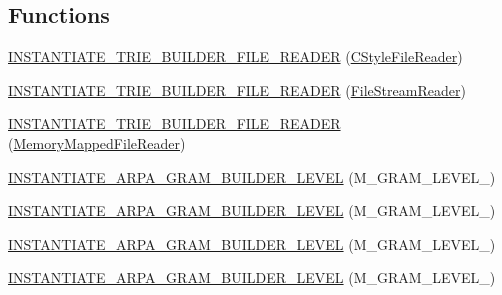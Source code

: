 \subsection*{Functions}
\begin{DoxyCompactItemize}
\item 
\hyperlink{namespaceuva_1_1smt_1_1bpbd_1_1server_1_1lm_1_1arpa_a3abd0485a67c1594eaf33dd0faeb4a70}{I\+N\+S\+T\+A\+N\+T\+I\+A\+T\+E\+\_\+\+T\+R\+I\+E\+\_\+\+B\+U\+I\+L\+D\+E\+R\+\_\+\+F\+I\+L\+E\+\_\+\+R\+E\+A\+D\+E\+R} (\hyperlink{classuva_1_1utils_1_1file_1_1_c_style_file_reader}{C\+Style\+File\+Reader})
\item 
\hyperlink{namespaceuva_1_1smt_1_1bpbd_1_1server_1_1lm_1_1arpa_a2dfedb4ab8ce840c46c677d09bcb2f13}{I\+N\+S\+T\+A\+N\+T\+I\+A\+T\+E\+\_\+\+T\+R\+I\+E\+\_\+\+B\+U\+I\+L\+D\+E\+R\+\_\+\+F\+I\+L\+E\+\_\+\+R\+E\+A\+D\+E\+R} (\hyperlink{classuva_1_1utils_1_1file_1_1_file_stream_reader}{File\+Stream\+Reader})
\item 
\hyperlink{namespaceuva_1_1smt_1_1bpbd_1_1server_1_1lm_1_1arpa_af3dfbdd835453813dcb20adedfbba9c8}{I\+N\+S\+T\+A\+N\+T\+I\+A\+T\+E\+\_\+\+T\+R\+I\+E\+\_\+\+B\+U\+I\+L\+D\+E\+R\+\_\+\+F\+I\+L\+E\+\_\+\+R\+E\+A\+D\+E\+R} (\hyperlink{classuva_1_1utils_1_1file_1_1_memory_mapped_file_reader}{Memory\+Mapped\+File\+Reader})
\item 
\hyperlink{namespaceuva_1_1smt_1_1bpbd_1_1server_1_1lm_1_1arpa_aeb9e5217f2df56aebcf96721d5ef9d1e}{I\+N\+S\+T\+A\+N\+T\+I\+A\+T\+E\+\_\+\+A\+R\+P\+A\+\_\+\+G\+R\+A\+M\+\_\+\+B\+U\+I\+L\+D\+E\+R\+\_\+\+L\+E\+V\+E\+L} (M\+\_\+\+G\+R\+A\+M\+\_\+\+L\+E\+V\+E\+L\+\_)
\item 
\hyperlink{namespaceuva_1_1smt_1_1bpbd_1_1server_1_1lm_1_1arpa_afa64b0870997b1747c927e17edb4d8d2}{I\+N\+S\+T\+A\+N\+T\+I\+A\+T\+E\+\_\+\+A\+R\+P\+A\+\_\+\+G\+R\+A\+M\+\_\+\+B\+U\+I\+L\+D\+E\+R\+\_\+\+L\+E\+V\+E\+L} (M\+\_\+\+G\+R\+A\+M\+\_\+\+L\+E\+V\+E\+L\+\_)
\item 
\hyperlink{namespaceuva_1_1smt_1_1bpbd_1_1server_1_1lm_1_1arpa_a46958bd9f84f218dd00b21a23ddbeccf}{I\+N\+S\+T\+A\+N\+T\+I\+A\+T\+E\+\_\+\+A\+R\+P\+A\+\_\+\+G\+R\+A\+M\+\_\+\+B\+U\+I\+L\+D\+E\+R\+\_\+\+L\+E\+V\+E\+L} (M\+\_\+\+G\+R\+A\+M\+\_\+\+L\+E\+V\+E\+L\+\_)
\item 
\hyperlink{namespaceuva_1_1smt_1_1bpbd_1_1server_1_1lm_1_1arpa_a22b1018c33bdaa7517c530a1e10f5166}{I\+N\+S\+T\+A\+N\+T\+I\+A\+T\+E\+\_\+\+A\+R\+P\+A\+\_\+\+G\+R\+A\+M\+\_\+\+B\+U\+I\+L\+D\+E\+R\+\_\+\+L\+E\+V\+E\+L} (M\+\_\+\+G\+R\+A\+M\+\_\+\+L\+E\+V\+E\+L\+\_)
\item 

\end{DoxyCompactItemize}
